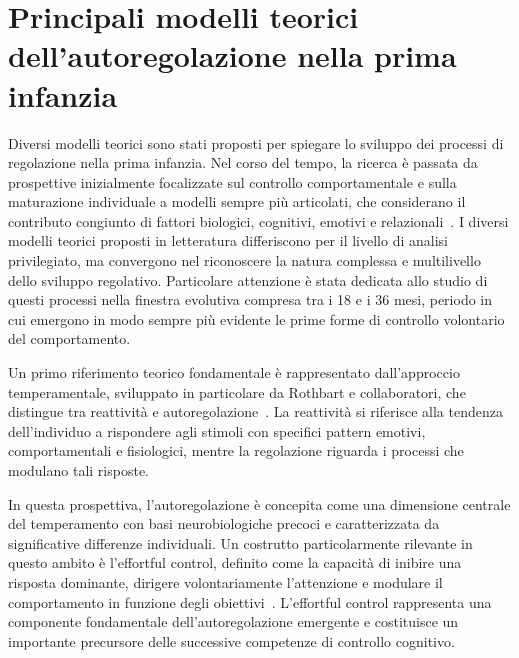     \section{Principali modelli teorici dell'autoregolazione nella prima infanzia}
    \label{sec:1_3}

        Diversi modelli teorici sono stati proposti per spiegare lo sviluppo dei processi di regolazione nella prima infanzia. Nel corso del tempo, la ricerca è passata da prospettive inizialmente focalizzate sul controllo comportamentale e sulla maturazione individuale a modelli sempre più articolati, che considerano il contributo congiunto di fattori biologici, cognitivi, emotivi e relazionali~\cite{blair2015,calkins2007}. I diversi modelli teorici proposti in letteratura differiscono per il livello di analisi privilegiato, ma convergono nel riconoscere la natura complessa e multilivello dello sviluppo regolativo. Particolare attenzione è stata dedicata allo studio di questi processi nella finestra evolutiva compresa tra i 18 e i 36 mesi, periodo in cui emergono in modo sempre più evidente le prime forme di controllo volontario del comportamento.

        Un primo riferimento teorico fondamentale è rappresentato dall'approccio temperamentale, sviluppato in particolare da Rothbart e collaboratori, che distingue tra reattività e autoregolazione~\cite{rothbart2005,rothbart2006}. La reattività si riferisce alla tendenza dell'individuo a rispondere agli stimoli con specifici pattern emotivi, comportamentali e fisiologici, mentre la regolazione riguarda i processi che modulano tali risposte.

        In questa prospettiva, l'autoregolazione è concepita come una dimensione centrale del temperamento con basi neurobiologiche precoci e caratterizzata da significative differenze individuali. Un costrutto particolarmente rilevante in questo ambito è l'effortful control, definito come la capacità di inibire una risposta dominante, dirigere volontariamente l'attenzione e modulare il comportamento in funzione degli obiettivi~\cite{rothbart2007}. L'effortful control rappresenta una componente fondamentale dell'autoregolazione emergente e costituisce un importante precursore delle successive competenze di controllo cognitivo.

